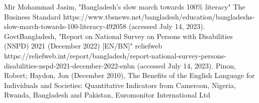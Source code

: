\begin{thebibliography}{00}
     Mir Mohammad Jasim, "Bangladesh’s slow march towards 100\% literacy" The Business Standard https://www.tbsnews.net/bangladesh/education/bangladeshs-slow-march-towards-100-literacy-492058 (accessed July 14, 2023).
     Govt\. Bangladesh, "Report on National Survey on Persons with Disabilities (NSPD) 2021 (December 2022) [EN/BN]" reliefweb https://reliefweb.int/report/bangladesh/report-national-survey-persons-disabilities-nspd-2021-december-2022-enbn (accessed July 14, 2023).
     Pinon, Robert; Haydon, Jon (December 2010), The Benefits of the English Language for Individuals and Societies: Quantitative Indicators from Cameroon, Nigeria, Rwanda, Bangladesh and Pakistan, Euromonitor International Ltd
\end{thebibliography}
